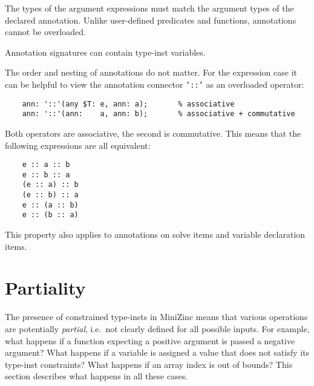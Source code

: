 \documentclass[10pt]{scrartcl}
\begin{document}
The types of the argument expressions must match the argument types of the
declared annotation.  Unlike user-defined predicates and functions,
annotations cannot be overloaded.  

Annotation signatures can contain type-inst variables.

The order and nesting of annotations do not matter.  For the expression case
it can be helpful to view the annotation connector \texttt{'::'} as an
overloaded operator:
\begin{verbatim}
    ann: '::'(any $T: e, ann: a);       % associative
    ann: '::'(ann:    a, ann: b);       % associative + commutative
\end{verbatim}
Both operators are associative, the second is commutative.  This means that
the following expressions are all equivalent:
\begin{verbatim}
    e :: a :: b
    e :: b :: a
    (e :: a) :: b
    (e :: b) :: a
    e :: (a :: b)
    e :: (b :: a)
\end{verbatim}
This property also applies to annotations on solve items and variable
declaration items.  


\section{Partiality}
  \label{Partiality}
The presence of constrained type-insts in MiniZinc means that
various operations are potentially \emph{partial}, i.e.~not clearly defined
for all possible inputs.  For example, what happens if a function expecting
a positive argument is passed a negative argument?  What happens if a
variable is assigned a value that does not satisfy its type-inst constraints?
What happens if an array index is out of bounds?  This section describes
what happens in all these cases.
\end{document}
